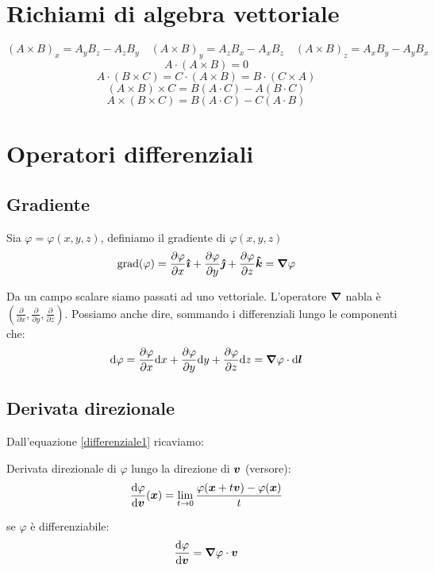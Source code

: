 \section{Richiami di algebra vettoriale}
\[
  (A\times B)_x=A_yB_z-A_zB_y\quad(A\times B)_y=A_zB_x-A_xB_z\quad(A\times B)_z=A_xB_y-A_yB_x
\]
\[A\cdot(A\times B)=0\]
\[A\cdot(B\times C)=C\cdot(A\times B)=B\cdot(C\times A)\]
\[(A\times B)\times C=B(A\cdot C)-A(B\cdot C)\]
\[A\times(B\times C)=B(A\cdot C)-C(A\cdot B)\]
\section{Operatori differenziali}
\subsection{Gradiente}
\begin{Def}
  Sia $\varphi=\varphi(x,y,z)$, definiamo il gradiente di $\varphi(x,y,z)$
  \[\operatorname{grad}({\varphi})=\frac{\partial \varphi}{\partial x}\boldsymbol{\hat {\imath}}+\frac{\partial \varphi}{\partial y}\boldsymbol{\hat {\jmath}}+\frac{\partial\varphi}{\partial z}\boldsymbol{\hat {k}}=\boldsymbol{\nabla}\varphi\]
\end{Def}
Da un campo scalare siamo passati ad uno vettoriale. L'operatore $\boldsymbol{\nabla}$ nabla è $\left(\frac{\partial}{\partial x},\frac{\partial}{\partial y},\frac{\partial}{\partial z}\right)$. Possiamo anche dire, sommando i differenziali lungo le componenti che:
\begin{equation}
  \label{differenziale1}
  \mathrm{d} \varphi=\frac{\partial\varphi}{\partial x}\mathrm{d} x+\frac{\partial\varphi}{\partial y}\mathrm{d} y+\frac{\partial\varphi}{\partial z}\mathrm{d} z=\boldsymbol{\nabla}\varphi\cdot\mathrm{d} \boldsymbol{l}\end{equation}
\subsection{Derivata direzionale}
Dall'equazione \eqref{differenziale1} ricaviamo:
\begin{Def}Derivata direzionale di $\varphi$ lungo la direzione di $\boldsymbol{v}$ (versore):
  \begin{equation}
    \frac{\mathrm{d}\varphi}{\mathrm{d} \boldsymbol{v}}(\boldsymbol{x})=\lim_{t\to 0}\frac{\varphi(\boldsymbol{x}+t\boldsymbol{v})-\varphi(\boldsymbol{x})}{t}
  \end{equation}
\end{Def}
se $\varphi$ è differenziabile:
\begin{equation}
  \label{differenziale2}
  \frac{\mathrm{d} \varphi}{\mathrm{d} \boldsymbol{v}}=\boldsymbol{\nabla}\varphi\cdot{\boldsymbol{v}}
\end{equation}

